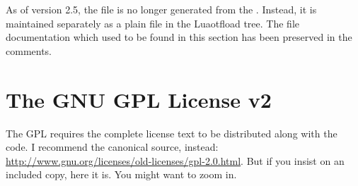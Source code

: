 As of version 2.5, the file  is no longer
generated from the .
%
Instead, it is maintained separately as a plain \identifier{\TEX} file
in the Luaotfload  tree.
%
The file documentation which used to be found in this section has
been preserved in the comments.

\clearpage
\section{The GNU GPL License v2}

The GPL requires the complete license text to be distributed along
with the code. I recommend the canonical source, instead:
\url{http://www.gnu.org/licenses/old-licenses/gpl-2.0.html}.
But if you insist on an included copy, here it is.
You might want to zoom in.

